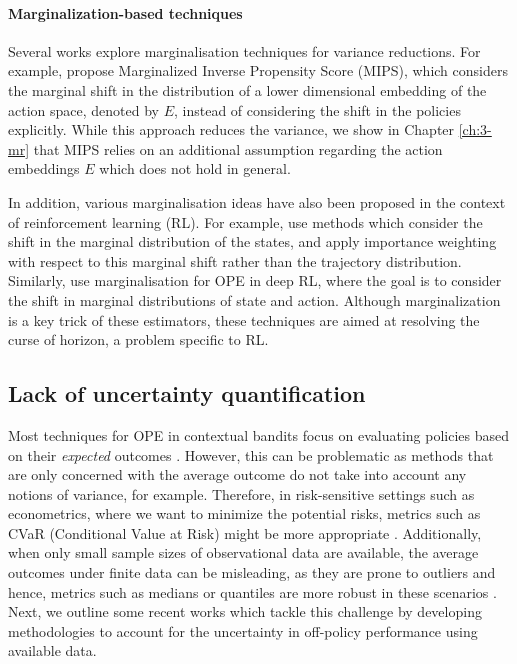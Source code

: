 \paragraph{Marginalization-based techniques}
Several works explore marginalisation techniques for variance reductions. For example, \cite{saito2022off} propose Marginalized Inverse Propensity Score (MIPS), which considers the marginal shift in the distribution of a lower dimensional embedding of the action space, denoted by $E$, instead of considering the shift in the policies explicitly. 
While this approach reduces the variance, we show in Chapter \ref{ch:3-mr} that MIPS relies on an additional assumption regarding the action embeddings $E$ which does not hold in general.

In addition, various marginalisation ideas have also been proposed in the context of reinforcement learning (RL). For example, \cite{liu2018breaking, xie2019advances, kallus2020off} use methods which consider the shift in the marginal distribution of the states, and apply importance weighting with respect to this marginal shift rather than the trajectory distribution. Similarly, \cite{Fujimoto2021deep} use marginalisation for OPE in deep RL, where the goal is to consider the shift in marginal distributions of state and action. Although marginalization is a key trick of these estimators, these techniques are aimed at resolving the curse of horizon, a problem specific to RL.



\subsection{Lack of uncertainty quantification}\label{subsec:uncertainty-quantification}
Most techniques for OPE in contextual bandits focus on evaluating policies based on their \emph{expected} outcomes \citep{uncertainty5, adaptive-ope, uncertainty2, uncertainty3, uncertainty4, doubly-robust}. However, this can be problematic as
methods that are only concerned with the average outcome do not take into account any notions of
variance, for example. Therefore, in risk-sensitive settings such as econometrics, where we want
to minimize the potential risks, metrics such as CVaR (Conditional Value at Risk) might be more
appropriate \citep{keramati2020being}. Additionally, when only small sample sizes of observational data are available, the average outcomes under finite data can be misleading, as they are prone to outliers and hence, metrics such as medians or quantiles are more robust in these scenarios \citep{altschuler2019best}. Next, we outline some recent works which tackle this challenge by developing methodologies to account for the uncertainty in off-policy performance using available data. 

